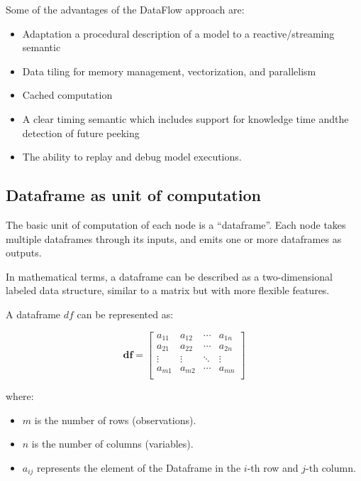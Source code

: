 \documentclass[11pt, reqno]{amsart}
\theoremstyle{definition}
\theoremstyle{remark}
\newcommand{\df}{\mathbf{df}}
\begin{document}
  Some of the advantages of the DataFlow approach are:
  \begin{itemize}
    \item Adaptation a procedural description of a model to a reactive/streaming semantic

    \item Data tiling for memory management, vectorization, and parallelism

    \item Cached computation

    \item A clear timing semantic which includes support for knowledge time andthe detection
      of future peeking

    \item The ability to replay and debug model executions.
  \end{itemize}




  \subsection{Dataframe as unit of computation}
  The basic unit of computation of each node is a ``dataframe''. Each node takes
  multiple dataframes through its inputs, and emits one or more dataframes as outputs.

  In mathematical terms, a dataframe can be described as a two-dimensional
  labeled data structure, similar to a matrix but with more flexible features.

  A dataframe $df$ can be represented as:

  \[
    \df = \left[
    \begin{array}{cccc}
      a_{11} & a_{12} & \cdots & a_{1n} \\
      a_{21} & a_{22} & \cdots & a_{2n} \\
      \vdots & \vdots & \ddots & \vdots \\
      a_{m1} & a_{m2} & \cdots & a_{mn} \\
    \end{array}
    \right]
  \]

  where:
  \begin{itemize}
    \item $m$ is the number of rows (observations).

    \item $n$ is the number of columns (variables).

    \item $a_{ij}$ represents the element of the Dataframe in the $i$-th row and
      $j$-th column.
  \end{itemize}
\end{document}
